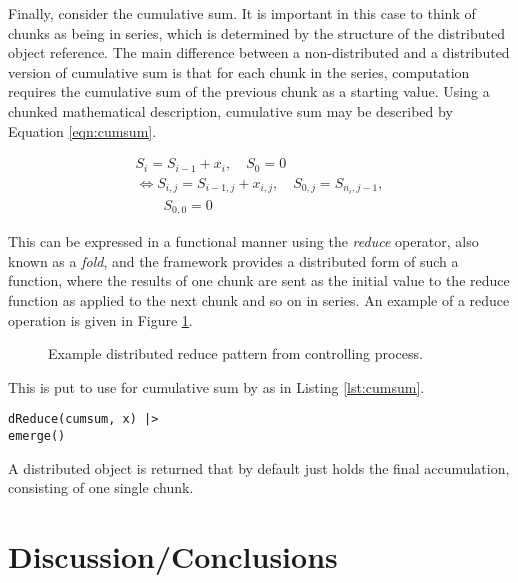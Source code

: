 \documentclass[letterpaper, inpress]{jds} %
\begin{document}
Finally, consider the cumulative sum.
It is important in this case to think of chunks as being in series, which is determined by the structure of the distributed object reference.
The main difference between a non-distributed and a distributed version of cumulative sum is that for each chunk in the series, computation requires the cumulative sum of the previous chunk as a starting value.
Using a chunked mathematical description, cumulative sum may be described by Equation \ref{eqn:cumsum}.

\begin{equation}
\begin{gathered}\label{eqn:cumsum}
    S_i = S_{i-1}+x_i, \quad S_0 = 0\\
    \iff S_{i,j} = S_{i-1,j} + x_{i,j}, \quad S_{0,j} = S_{n_i,j-1},\\
    \qquad S_{0,0} = 0
\end{gathered}
\end{equation}

This can be expressed in a functional manner using the \textit{reduce} operator, also known as a \textit{fold}, and the  framework provides a distributed form of such a function, where the results of one chunk are sent as the initial value to the reduce function as applied to the next chunk and so on in series.
An example of a reduce operation is given in Figure \ref{fig:dreduce}.

\begin{figure}[ht]
\begin{center}
    
\caption{Example distributed reduce pattern from controlling process.}
\label{fig:dreduce}
\end{center}
\end{figure}

This is put to use for cumulative sum by  as in Listing \ref{lst:cumsum}.

\begin{lstlisting}[caption={Distributed cumulative sum with largescaler},label={lst:cumsum}]
dReduce(cumsum, x) |>
emerge() 
\end{lstlisting}

A distributed object is returned that by default just holds the final accumulation, consisting of one single chunk.

\section{Discussion/Conclusions}
\end{document}
